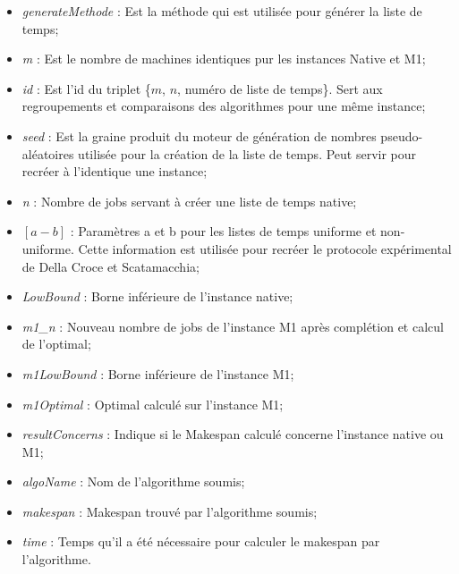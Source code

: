 \documentclass[a4paper,12pt]{report}
\theoremstyle{plain}				%
\theoremstyle{definition}				%
\newcommand\dcs{Della Croce et Scatamacchia\xspace}
\begin{document}
\begin{itemize}
	\item \textit{generateMethode} : Est la méthode qui est utilisée pour générer la liste de temps;
	 
	\item \textit{m} : Est le nombre de machines identiques pur les instances Native et M1;
	 
	\item \textit{id} : Est l'id du triplet \{$m$, $n$, numéro de liste de temps\}. 
	Sert aux regroupements et comparaisons des algorithmes pour une même instance;
	
	\item \textit{seed} : Est la graine produit du moteur de génération de nombres pseudo-aléatoires 
	utilisée pour la création de la liste de temps. 
	Peut servir pour recréer à l'identique une instance;
	 
	\item \textit{n} : Nombre de jobs servant à créer une liste de temps native;
	 
	\item \textit{$[a-b]$} : Paramètres a et b pour les listes de temps uniforme et non-uniforme. 
	Cette information est utilisée pour recréer le protocole expérimental de \dcs;
	
	\item \textit{LowBound} : Borne inférieure de l'instance native;
	
	\item \textit{m1\_n} : Nouveau nombre de jobs de l'instance M1 après complétion et calcul de l'optimal;
	
	\item \textit{m1LowBound} : Borne inférieure de l'instance M1;
	
	\item \textit{m1Optimal} : Optimal calculé sur l'instance M1;
	
	\item \textit{resultConcerns} : Indique si le Makespan calculé concerne l'instance native ou M1;
	
	\item \textit{algoName} : Nom de l'algorithme soumis;
	
	\item \textit{makespan} : Makespan trouvé par l'algorithme soumis;
	
	\item \textit{time} : Temps qu'il a été nécessaire pour calculer le makespan	par l’algorithme. 
\end{itemize}
\end{document}
